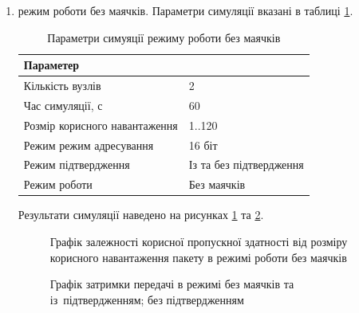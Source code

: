\documentclass[a4paper,ukrainian,utf8,nocolumnsxix,floatsection]{eskdtext}
\begin{document}
\begin{enumerate}
	\item режим роботи без маячків. Параметри симуляції вказані в таблиці \ref{tbl:simulation_settings_nonbeackon}.

	\begin{table}[htbp]
	\caption{Параметри симуяції режиму роботи без маячків}
	\centering
	\begin{tabular}{|l|l|}
		\hline
		Параметер                     &                         \\ \hline
		Кількість вузлів              & 2                       \\ \hline
		Час симуляції, с              & 60                      \\ \hline
		Розмір корисного навантаження & 1..120                  \\ \hline
		Режим режим адресування       & 16 біт                  \\ \hline
		Режим підтвердження           & Із та без підтвердження \\ \hline
		Режим роботи                  & Без маячків             \\ \hline
	\end{tabular}
	\label{tbl:simulation_settings_nonbeackon}
	\end{table}

	Результати симуляції наведено на рисунках \ref{fig:result_tp_nonbeacon} та \ref{fig:result_jts_nonbeacon}.

	\begin{figure}[bth]
		\centering
		\caption{\label{fig:result_tp_nonbeacon}Графік залежності корисної пропускної здатності від розміру корисного навантаження пакету в режимі роботи без маячків}
	\end{figure}

	\begin{figure}[bth]
		\centering
		\caption{Графік затримки передачі в режимі без маячків та 
			\protect{} із~підтвердженням; 
			\protect{} без підтвердженням
			}\label{fig:result_jts_nonbeacon}
	\end{figure}


\end{enumerate}
\end{document}
